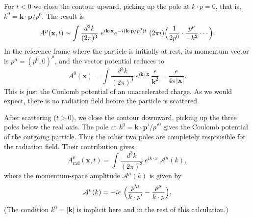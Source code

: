For $t < 0$ we close the contour upward, picking up the pole at
$k\cdot p = 0$, that is, $k^0 = \mathbf{k}\cdot\mathbf{p}/p^0$.  The result is
\begin{equation}
  A^\mu(\mathbf{x}, t) \sim \int \frac{d^3k}{(2\pi)^3}\ e^{i\mathbf{k}\cdot\mathbf{x}}
    e^{-i(\mathbf{k}\cdot\mathbf{p}/p^0)t}\ (2\pi i)\Bigl( \frac{1}{2p^0}
      \cdot \frac{p^\mu}{-k^2}\cdots \Bigr).
\end{equation}
In the reference frame where the particle is initially at rest, its momentum
vector is $p^\mu = (p^0, 0)^\mu$, and the vector potential reduces to
\begin{equation}
  A^0(\mathbf{x}) = \int \frac{d^3k}{(2\pi)^3}\ e^{i\mathbf{k}\cdot\mathbf{x}}\
    \frac{e}{\mathbf{k}^2} = \frac{e}{4\pi|\mathbf{x}|} .
\end{equation}
This is just the Coulomb potential of an unaccelerated charge.  As we would
expect, there is no radiation field before the particle is scattered.

After scattering ($t > 0$), we close the contour downward, picking up the
three poles below the real axis.  The pole at
$k^0 = \mathbf{k}\cdot\mathbf{p}'/p'^0$ gives the Coulomb potential of the
outgoing particle.  Thus the other two poles are completely responsible for
the radiation field.  Their contribution gives
\begin{equation}
  A^\mu_{\mathrm{rad}}(\mathbf{x}, t) =
    \int \frac{d^3k}{(2\pi)^3}\ e^{ik\cdot x}\ \mathcal{A}^\mu(k),
  \label{eq:6.6}
\end{equation}
where the momentum-space amplitude $\mathcal{A}^\mu(k)$ is given by
\begin{equation}
  \mathcal{A}^\mu(k) = -ie\ \Bigl( \frac{p'^{\mu}}{k\cdot p'}
    - \frac{p^{\mu}}{k\cdot p} \Bigr).
  \label{eq:6.7}
\end{equation}
(The condition $k^0 = |\mathbf{k}|$ is implicit here and in the rest of this
calculation.)


